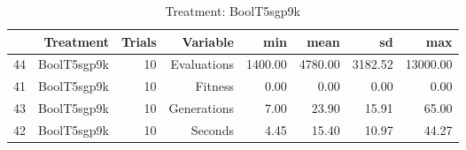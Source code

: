 \begin{table}[ht]
\centering
\begin{tabular}{rrrrrrrr}
  \hline
 & Treatment & Trials & Variable & min & mean & sd & max \\ 
  \hline
44 & BoolT5sgp9k &  10 & Evaluations & 1400.00 & 4780.00 & 3182.52 & 13000.00 \\ 
  41 & BoolT5sgp9k &  10 & Fitness & 0.00 & 0.00 & 0.00 & 0.00 \\ 
  43 & BoolT5sgp9k &  10 & Generations & 7.00 & 23.90 & 15.91 & 65.00 \\ 
  42 & BoolT5sgp9k &  10 & Seconds & 4.45 & 15.40 & 10.97 & 44.27 \\ 
   \hline
\end{tabular}
\caption{Treatment: BoolT5sgp9k} 
\end{table}
